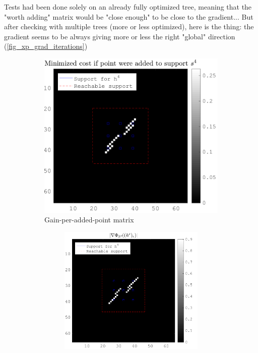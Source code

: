 Tests had been done solely on an already fully optimized tree, meaning that the "worth adding" matrix would be "close enough" to be close to the gradient...
But after checking with multiple trees (more or less optimized), here is the thing: the gradient seems to be always giving more or less the right "global" direction (\cref{fig_xp_grad_iterations})

\begin{figure}[!h]\centering
\begin{subfigure}[b]{0.49\textwidth}\centering
\includegraphics[width=\textwidth]{figures/xp_grad_iterations/xp_128x128_sc2_angl1_K3_S3_node4_objmatrix_bestvalues.png}
\caption{Gain-per-added-point matrix}
\end{subfigure}
\begin{subfigure}[b]{0.49\textwidth}\centering
	\begin{subfigure}[b]{0.49\textwidth}\centering
	\includegraphics[width=\textwidth]{figures/xp_grad_iterations/xp_128x128_sc2_angl1_K3_S3_node4_1thiteration_partgrad4_bestvalues.png}

\end{subfigure}
\end{subfigure}
\end{figure}
